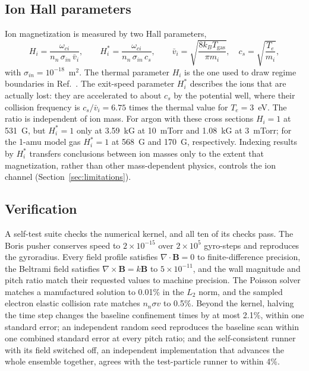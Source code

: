 \documentclass[11pt]{article}
\begin{document}
\subsection{Ion Hall parameters}
\label{sec:hall}

Ion magnetization is measured by two Hall parameters,
\begin{equation}
H_i = \frac{\omega_{ci}}{n_n\,\sigma_{in}\,\bar v_i}, \qquad
H_i^* = \frac{\omega_{ci}}{n_n\,\sigma_{in}\,c_s}, \qquad
\bar v_i = \sqrt{\frac{8k_BT_{\mathrm{gas}}}{\pi m_i}}, \quad c_s = \sqrt{\frac{T_e}{m_i}},
\label{eq:hall}
\end{equation}
with $\sigma_{in} = 10^{-18}$~m$^2$. The thermal parameter $H_i$ is the one used to draw regime boundaries in Ref.~\cite{auerbach2026}. The exit-speed parameter $H_i^*$ describes the ions that are actually lost: they are accelerated to about $c_s$ by the potential well, where their collision frequency is $c_s/\bar v_i = 6.75$ times the thermal value for $T_e = 3$~eV. The ratio is independent of ion mass. For argon with these cross sections $H_i = 1$ at 531~G, but $H_i^* = 1$ only at 3.59~kG at 10~mTorr and 1.08~kG at 3~mTorr; for the 1-amu model gas $H_i^* = 1$ at 568~G and 170~G, respectively. Indexing results by $H_i^*$ transfers conclusions between ion masses only to the extent that magnetization, rather than other mass-dependent physics, controls the ion channel (Section~\ref{sec:limitations}).

\subsection{Verification}
\label{sec:verification}

A self-test suite checks the numerical kernel, and all ten of its checks pass. The Boris pusher conserves speed to $2\times10^{-15}$ over $2\times10^5$ gyro-steps and reproduces the gyroradius. Every field profile satisfies $\nabla\cdot\mathbf{B} = 0$ to finite-difference precision, the Beltrami field satisfies $\nabla\times\mathbf{B} = k\mathbf{B}$ to $5\times10^{-11}$, and the wall magnitude and pitch ratio match their requested values to machine precision. The Poisson solver matches a manufactured solution to 0.01\% in the $L_2$ norm, and the sampled electron elastic collision rate matches $n_n\sigma v$ to 0.5\%. Beyond the kernel, halving the time step changes the baseline confinement times by at most 2.1\%, within one standard error; an independent random seed reproduces the baseline scan within one combined standard error at every pitch ratio; and the self-consistent runner with its field switched off, an independent implementation that advances the whole ensemble together, agrees with the test-particle runner to within 4\%.
\end{document}
